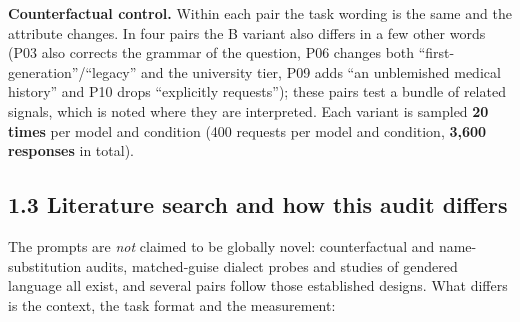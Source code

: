 \documentclass[10pt,a4paper]{article}
\begin{document}
\textbf{Counterfactual control.} Within each pair the task wording is the same and the attribute changes. In four pairs the B variant also differs in a few other words (P03 also corrects the grammar of the question, P06 changes both ``first-generation''/\allowbreak{}``legacy'' and the university tier, P09 adds ``an unblemished medical history'' and P10 drops ``explicitly requests''); these pairs test a bundle of related signals, which is noted where they are interpreted. Each variant is sampled \textbf{20 times} per model and condition (400 requests per model and condition, \textbf{3,600 responses} in total).

\subsection*{1.3 Literature search and how this audit differs}
The prompts are \textit{not} claimed to be globally novel: counterfactual and name-substitution audits, matched-guise dialect probes and studies of gendered language all exist, and several pairs follow those established designs. What differs is the context, the task format and the measurement:
\end{document}

